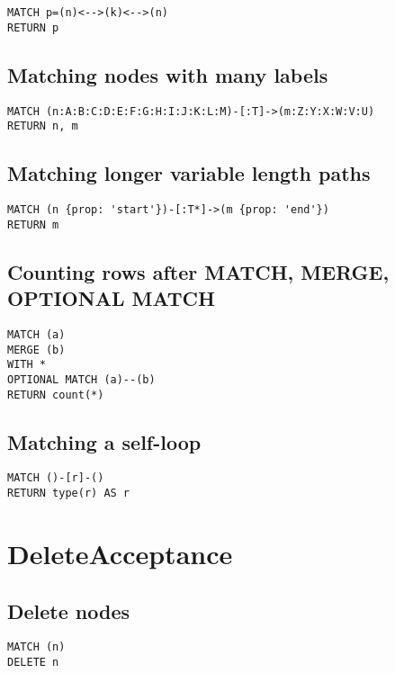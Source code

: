 \begin{lstlisting}
MATCH p=(n)<-->(k)<-->(n)
RETURN p
\end{lstlisting}

\subsection{Matching nodes with many labels}

\begin{lstlisting}
MATCH (n:A:B:C:D:E:F:G:H:I:J:K:L:M)-[:T]->(m:Z:Y:X:W:V:U)
RETURN n, m
\end{lstlisting}

\subsection{Matching longer variable length paths}

\begin{lstlisting}
MATCH (n {prop: 'start'})-[:T*]->(m {prop: 'end'})
RETURN m
\end{lstlisting}

\subsection{Counting rows after MATCH, MERGE, OPTIONAL MATCH}

\begin{lstlisting}
MATCH (a)
MERGE (b)
WITH *
OPTIONAL MATCH (a)--(b)
RETURN count(*)
\end{lstlisting}

\subsection{Matching a self-loop}

\begin{lstlisting}
MATCH ()-[r]-()
RETURN type(r) AS r
\end{lstlisting}
\section{DeleteAcceptance}


\subsection{Delete nodes}

\begin{lstlisting}
MATCH (n)
DELETE n
\end{lstlisting}

